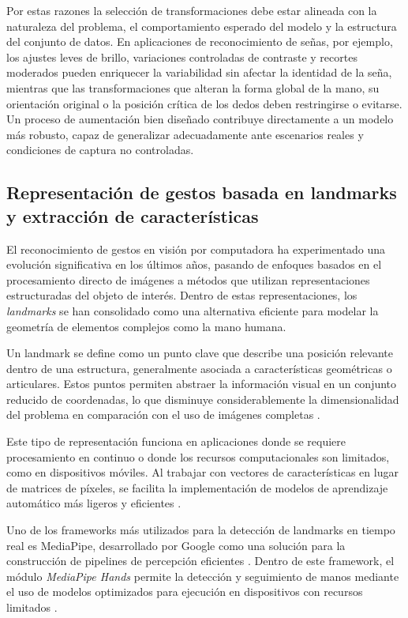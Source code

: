 	Por estas razones la selección de transformaciones debe estar alineada con la naturaleza del problema, el comportamiento esperado del modelo y la estructura del conjunto de datos. En aplicaciones de reconocimiento de señas, por ejemplo, los ajustes leves de brillo, variaciones controladas de contraste y recortes moderados pueden enriquecer la variabilidad sin afectar la identidad de la seña, mientras que las transformaciones que alteran la forma global de la mano, su orientación original o la posición crítica de los dedos deben restringirse o evitarse. Un proceso de aumentación bien diseñado contribuye directamente a un modelo más robusto, capaz de generalizar adecuadamente ante escenarios reales y condiciones de captura no controladas. 
	\subsection{Representación de gestos basada en landmarks y extracción de características}
	El reconocimiento de gestos en visión por computadora ha experimentado una evolución significativa en los últimos años, pasando de enfoques basados en el procesamiento directo de imágenes a métodos que utilizan representaciones estructuradas del objeto de interés. Dentro de estas representaciones, los \textit{landmarks} se han consolidado como una alternativa eficiente para modelar la geometría de elementos complejos como la mano humana.
	
	Un landmark se define como un punto clave que describe una posición relevante dentro de una estructura, generalmente asociada a características geométricas o articulares. Estos puntos permiten abstraer la información visual en un conjunto reducido de coordenadas, lo que disminuye considerablemente la dimensionalidad del problema en comparación con el uso de imágenes completas \cite{bishop2006pattern}.
	
	Este tipo de representación funciona en aplicaciones donde se requiere procesamiento en continuo o donde los recursos computacionales son limitados, como en dispositivos móviles. Al trabajar con vectores de características en lugar de matrices de píxeles, se facilita la implementación de modelos de aprendizaje automático más ligeros y eficientes \cite{geron2019hands}.
	
	Uno de los frameworks más utilizados para la detección de landmarks en tiempo real es MediaPipe, desarrollado por Google como una solución para la construcción de pipelines de percepción eficientes \cite{lugaresi2019mediapipe}. Dentro de este framework, el módulo \textit{MediaPipe Hands} permite la detección y seguimiento de manos mediante el uso de modelos optimizados para ejecución en dispositivos con recursos limitados \cite{mediapipe_hands}.
	
